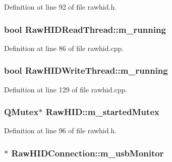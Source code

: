 \-Definition at line 92 of file rawhid.\-h.

\hypertarget{group___raw_h_i_d_plugin_ga0b977a016ba6a452e9bdf1d49e2d89e3}{
\subsubsection[{m\-\_\-running}]{\setlength{\rightskip}{0pt plus 5cm}bool {\bf \-Raw\-H\-I\-D\-Read\-Thread\-::m\-\_\-running}}}\label{group___raw_h_i_d_plugin_ga0b977a016ba6a452e9bdf1d49e2d89e3}


\-Definition at line 86 of file rawhid.\-cpp.

\hypertarget{group___raw_h_i_d_plugin_gaf4f4725b8f0b6ed4b9b5c751397d0abe}{
\subsubsection[{m\-\_\-running}]{\setlength{\rightskip}{0pt plus 5cm}bool {\bf \-Raw\-H\-I\-D\-Write\-Thread\-::m\-\_\-running}}}\label{group___raw_h_i_d_plugin_gaf4f4725b8f0b6ed4b9b5c751397d0abe}


\-Definition at line 129 of file rawhid.\-cpp.

\hypertarget{group___raw_h_i_d_plugin_ga62ee841aa1de86d73cfd1b9bc7a5d719}{
\subsubsection[{m\-\_\-started\-Mutex}]{\setlength{\rightskip}{0pt plus 5cm}\-Q\-Mutex$\ast$ {\bf \-Raw\-H\-I\-D\-::m\-\_\-started\-Mutex}}}\label{group___raw_h_i_d_plugin_ga62ee841aa1de86d73cfd1b9bc7a5d719}


\-Definition at line 96 of file rawhid.\-h.

\hypertarget{group___raw_h_i_d_plugin_ga03aaa7c95bd19c0d373b3c2b4e982cdb}{
\subsubsection[{m\-\_\-usb\-Monitor}]{$\ast$ {\bf \-Raw\-H\-I\-D\-Connection\-::m\-\_\-usb\-Monitor}}}\label{group___raw_h_i_d_plugin_ga03aaa7c95bd19c0d373b3c2b4e982cdb}


